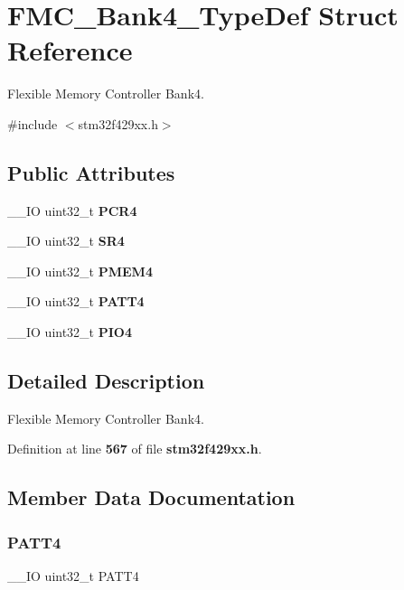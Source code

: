 \section{F\+M\+C\+\_\+\+Bank4\+\_\+\+Type\+Def Struct Reference}
\label{structFMC__Bank4__TypeDef}


Flexible Memory Controller Bank4.  




{\ttfamily \#include $<$stm32f429xx.\+h$>$}

\subsection*{Public Attributes}
\begin{DoxyCompactItemize}
\item 
\+\_\+\+\_\+\+IO uint32\+\_\+t \textbf{ P\+C\+R4}
\item 
\+\_\+\+\_\+\+IO uint32\+\_\+t \textbf{ S\+R4}
\item 
\+\_\+\+\_\+\+IO uint32\+\_\+t \textbf{ P\+M\+E\+M4}
\item 
\+\_\+\+\_\+\+IO uint32\+\_\+t \textbf{ P\+A\+T\+T4}
\item 
\+\_\+\+\_\+\+IO uint32\+\_\+t \textbf{ P\+I\+O4}
\end{DoxyCompactItemize}


\subsection{Detailed Description}
Flexible Memory Controller Bank4. 

Definition at line \textbf{ 567} of file \textbf{ stm32f429xx.\+h}.



\subsection{Member Data Documentation}
\mbox{\label{structFMC__Bank4__TypeDef_a955cad1aab7fb2d5b6e216cb29b5e7e2}} 
\subsubsection{P\+A\+T\+T4}
{\footnotesize\ttfamily \+\_\+\+\_\+\+IO uint32\+\_\+t P\+A\+T\+T4}

